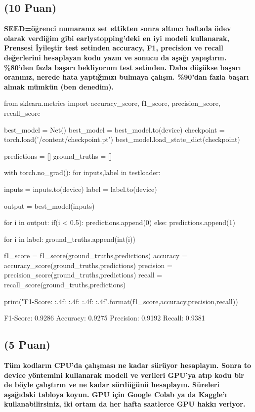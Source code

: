 \documentclass[11pt]{article}
\begin{document}
\subsection{(10 Puan)} \textbf{SEED=öğrenci numaranız set ettikten sonra altıncı haftada ödev olarak verdiğim gibi earlystopping'deki en iyi modeli kullanarak, Prensesi İyileştir test setinden accuracy, F1, precision ve recall değerlerini hesaplayan kodu yazın ve sonucu da aşağı yapıştırın. \%80'den fazla başarı bekliyorum test setinden. Daha düşükse başarı oranınız, nerede hata yaptığınızı bulmaya çalışın. \%90'dan fazla başarı almak mümkün (ben denedim).}

\begin{python}
from sklearn.metrics import accuracy_score, f1_score, precision_score, recall_score

best_model = Net()
best_model = best_model.to(device)
checkpoint = torch.load('/content/checkpoint.pt')
best_model.load_state_dict(checkpoint)

predictions = []
ground_truths = []

with torch.no_grad():
  for inputs,label in testloader:

      inputs = inputs.to(device)
      label = label.to(device)

      output = best_model(inputs)

      for i in output:
        if(i < 0.5):
          predictions.append(0)
        else:
          predictions.append(1)
      
      for i in label:
        ground_truths.append(int(i))
      
f1_score = f1_score(ground_truths,predictions)
accuracy = accuracy_score(ground_truths,predictions)
precision = precision_score(ground_truths,predictions)
recall = recall_score(ground_truths,predictions)

print("F1-Score: {:.4f}\nAccuracy: {:.4f}\nPrecision: {:.4f}\nRecall: {:.4f}".format(f1_score,accuracy,precision,recall))
\end{python}

F1-Score: 0.9286
Accuracy: 0.9275
Precision: 0.9192
Recall: 0.9381

\subsection{(5 Puan)} \textbf{Tüm kodların CPU'da çalışması ne kadar sürüyor hesaplayın. Sonra to device yöntemini kullanarak modeli ve verileri GPU'ya atıp kodu bir de böyle çalıştırın ve ne kadar sürdüğünü hesaplayın. Süreleri aşağıdaki tabloya koyun. GPU için Google Colab ya da Kaggle'ı kullanabilirsiniz, iki ortam da her hafta saatlerce GPU hakkı veriyor.}
\end{document}
